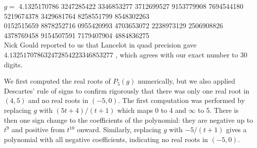 \documentclass[reqno]{amsart}
\numberwithin{equation}{section}
\begin{document}
\vspace{.1in}
\noindent
$g=$
\vspace{-.05in}
{\tiny{
4.1325170786 3247285422 3346853277 3712699527 9153779908 7694544180 5219674378 3429681764 8258551799 8548302263 \\
 \hspace*{.35in}
0152515659  8878252716 0955420993 4703653072 2238973129 2506908826 4378769458 9154507591 7179407904 4884836275
}}
\vspace{-.4in}
\begin{equation}
\label{eq:200}
\end{equation}
Nick Gould reported to us that Lancelot in quad precision gave $4.132517078632472854223346853277$ \cite{gould2026}, which agrees with our exact number to 30 digits.


We first computed the real roots of $P_5(g)$ numerically, but we also applied
Descartes' rule of signs to confirm rigorously that there was only
one real root in $(4,5)$ and no real roots in $(-5,0)$.
The first computation was performed by replacing $g$ with $(5t+4)/(t+1)$
which maps $0$ to $4$ and $\infty$ to $5$.  There is then one sign
change to the coefficients of the polynomial: they are negative up to $t^9$ and
positive from $t^{10}$ onward.
Similarly, replacing $g$ with $-5/(t+1)$ gives a polynomial with all negative
coefficients, indicating no real roots in $(-5,0)$.
\end{document}
